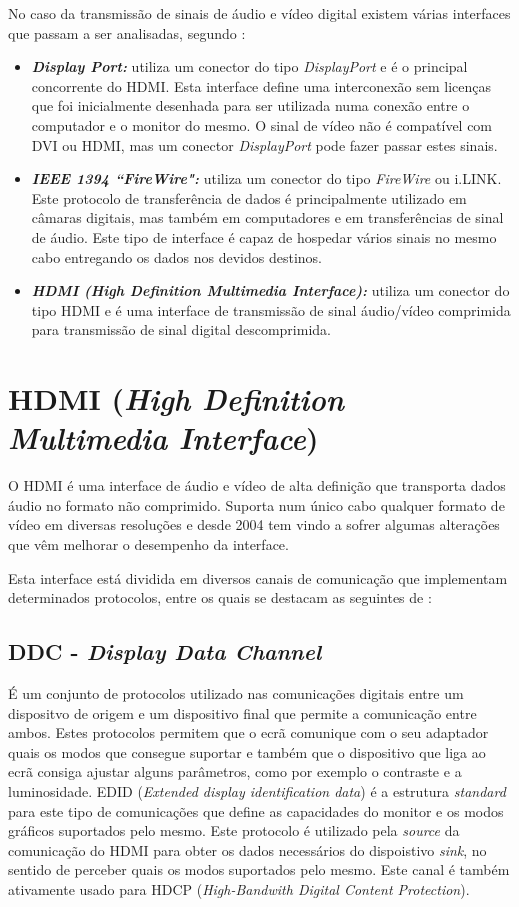 No caso da transmissão de sinais de áudio e vídeo digital existem várias interfaces que passam a ser analisadas, segundo \cite{R004}:
\begin{itemize}
	\item \textbf{\textit{Display Port:}} utiliza um conector do tipo \textit{DisplayPort} e é o principal concorrente do HDMI. Esta interface define uma interconexão sem licenças que foi inicialmente desenhada para ser utilizada numa conexão entre o computador e o monitor do mesmo. O sinal de vídeo não é compatível com DVI ou HDMI, mas um conector \textit{DisplayPort} pode fazer passar estes sinais.
	\item \textbf{\textit{ IEEE 1394 “FireWire":}} utiliza um conector do tipo \textit{FireWire} ou i.LINK. Este protocolo de transferência de dados é principalmente utilizado em câmaras digitais, mas também em computadores e em transferências de sinal de áudio. Este tipo de interface é capaz de hospedar vários sinais no mesmo cabo entregando os dados nos devidos destinos.
	\item \textbf{\textit{HDMI (High Definition Multimedia Interface):}} utiliza um conector do tipo HDMI e é uma interface de transmissão de sinal áudio/vídeo comprimida para transmissão de sinal digital descomprimida. 
\end{itemize}

\section{HDMI (\textit{High Definition Multimedia Interface})}\label{sec:HDMI}
O HDMI é uma interface de áudio e vídeo de alta definição que transporta dados áudio no formato não comprimido. Suporta num único cabo qualquer formato de vídeo em diversas resoluções e desde 2004 tem vindo a sofrer algumas alterações que vêm melhorar o desempenho da interface. 

Esta interface está dividida em diversos canais de comunicação que implementam determinados protocolos, entre os quais se destacam as seguintes de \cite{R002}:
\subsection{DDC - \textit{Display Data Channel} } \label{subsec:DDC} 
É um conjunto de protocolos utilizado nas comunicações digitais entre um dispositvo de origem e um dispositivo final que permite a comunicação entre ambos. Estes protocolos permitem que o ecrã comunique com o seu adaptador quais os modos que consegue suportar e também que o dispositivo que liga ao ecrã consiga ajustar alguns parâmetros, como por exemplo o contraste e a luminosidade. EDID (\textit{Extended display identification data}) é a estrutura \textit{standard} para este tipo de comunicações que define as capacidades do monitor e os modos gráficos suportados pelo mesmo.  Este protocolo é utilizado pela \textit{source} da comunicação do HDMI para obter os dados necessários do dispoistivo \textit{sink}, no sentido de perceber quais os modos suportados pelo mesmo. Este canal é também ativamente usado para HDCP (\textit{High-Bandwith Digital Content Protection}).

